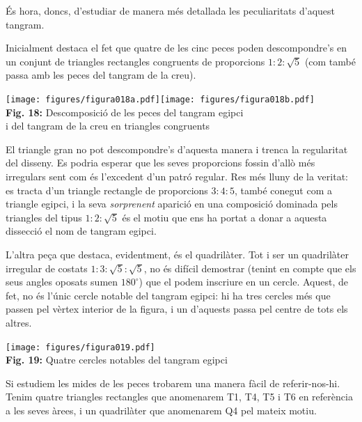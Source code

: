 \documentclass[a4paper,11pt]{article}
\begin{document}
\begin{multicols}{2}
            És hora, doncs, d'estudiar de manera més detallada les peculiaritats d'aquest tangram.

            Inicialment destaca el fet que quatre de les cinc peces poden descompondre's en un conjunt de triangles rectangles congruents de proporcions ${1:2:\sqrt{5}}$ (com també passa amb les peces del tangram de la creu).

            \begin{center}
                \texttt{[image: figures/figura018a.pdf]}\qquad\texttt{[image: figures/figura018b.pdf]} \\
                \footnotesize{\textbf{Fig. 18:} Descomposició de les peces del tangram egipci\\ i del tangram de la creu en triangles congruents}
            \end{center}

            El triangle gran no pot descompondre's d'aquesta manera i trenca la regularitat del disseny. Es podria esperar que les seves proporcions fossin d'allò més irregulars sent com és l'excedent d'un patró regular. Res més lluny de la veritat: es tracta d'un triangle rectangle de proporcions ${3:4:5}$, també conegut com a triangle egipci, i la seva \emph{sorprenent} aparició en una composició dominada pels triangles del tipus ${1:2:\sqrt{5}}$ és el motiu que ens ha portat a donar a aquesta dissecció el nom de tangram egipci.

            L'altra peça que destaca, evidentment, és el quadrilàter. Tot i ser un quadrilàter irregular de costats ${1:3:\sqrt{5}:\sqrt{5}}$, no és difícil demostrar (tenint en compte que els seus angles oposats sumen $180^\circ$) que el podem inscriure en un cercle. Aquest, de fet, no és l'únic cercle notable del tangram egipci: hi ha tres cercles més que passen pel vèrtex interior de la figura, i un d'aquests passa pel centre de tots els altres.

            \begin{center}
                \texttt{[image: figures/figura019.pdf]} \\
                \footnotesize{\textbf{Fig. 19:} Quatre cercles notables del tangram egipci}
            \end{center}

            Si estudiem les mides de les peces trobarem una manera fàcil de referir-nos-hi. Tenim quatre triangles rectangles que anomenarem T1, T4, T5 i T6 en referència a les seves àrees, i un quadrilàter que anomenarem Q4 pel mateix motiu.


\end{multicols}
\end{document}
